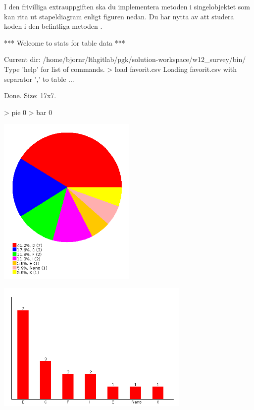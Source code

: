 I den frivilliga extrauppgiften ska du implementera metoden  i singelobjektet  som kan rita ut stapeldiagram enligt figuren nedan. Du har nytta av att studera koden i den befintliga metoden .
\begin{REPLnonum}
*** Welcome to stats for table data ***

Current dir: /home/bjornr/lthgitlab/pgk/solution-workspace/w12_survey/bin/
Type 'help' for list of commands.
> load favorit.csv
Loading favorit.csv
  with separator ',' to table ...

Done. Size: 17x7.

> pie 0
> bar 0
\end{REPLnonum}

\includegraphics[width=0.5\textwidth]{../img/survey/pie.png}

\includegraphics[width=0.7\textwidth]{../img/survey/bar.png}
